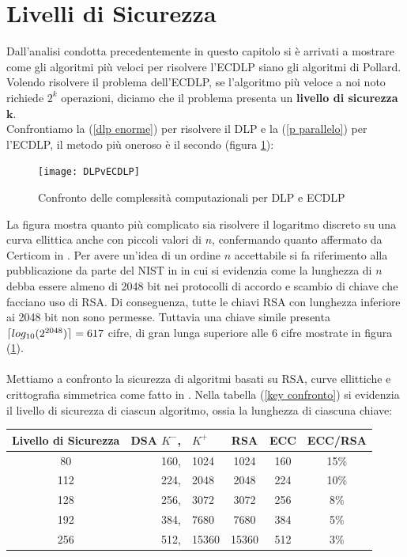 \documentclass[a4paper,12pt]{tesiinfo}
\DeclarePairedDelimiter\ceil{\lceil}{\rceil}
\begin{document}
\section{Livelli di Sicurezza}
Dall'analisi condotta precedentemente in questo capitolo si \`e arrivati a mostrare come gli algoritmi pi\`u veloci per risolvere l'ECDLP siano gli algoritmi di Pollard. Volendo risolvere il problema dell'ECDLP, se l'algoritmo pi\`u veloce a noi noto richiede $2^k$ operazioni, diciamo che il problema presenta un \textbf{livello di sicurezza }$\mathbold{k}$. 
\\
Confrontiamo la (\ref{dlp enorme}) per risolvere il DLP e la (\ref{p parallelo}) per l'ECDLP, il metodo pi\`u oneroso \`e il secondo (figura \ref{DLPvECDLP}):
\begin{figure}[H]
 \texttt{[image: DLPvECDLP]}
 \caption{Confronto delle complessit\`a computazionali per DLP e ECDLP}
 \label{DLPvECDLP}
\end{figure}
La figura mostra quanto pi\`u complicato sia risolvere il logaritmo discreto su una curva ellittica anche con piccoli valori di $n$, confermando quanto affermato da Certicom in \cite{Certicom pollard p}. 
Per avere un'idea di un ordine $n$ accettabile si fa riferimento alla pubblicazione da parte del NIST in \cite{NIST key lenght} in cui si evidenzia come la lunghezza di $n$ debba essere almeno di 2048 bit nei protocolli di accordo e scambio di chiave che facciano uso di RSA. Di conseguenza, tutte le chiavi RSA con lunghezza inferiore ai 2048 bit non sono permesse. Tuttavia una chiave simile presenta $\ceil{log_{10}(2^{2048})} = 617$ cifre, di gran lunga superiore alle 6 cifre mostrate in figura (\ref{DLPvECDLP}).
\\
\\
Mettiamo a confronto la sicurezza di algoritmi basati su RSA, curve ellittiche e crittografia simmetrica come fatto in \cite{nist key conf}. Nella tabella (\ref{key confronto}) si evidenzia il livello di sicurezza di ciascun algoritmo, ossia la lunghezza di ciascuna chiave:
\begin{center}
\begin{tabular}{c| r l| c| c| c}
    Livello di Sicurezza & DSA $K^-$, & $K^+$ & RSA & ECC & ECC/RSA\\
   \hline
    80 & 160, & 1024 & 1024 & 160 & 15\%\\
    112 & 224, & 2048 & 2048 & 224 & 10\%\\
    128 & 256, & 3072 & 3072 & 256 & 8\%\\
    192 & 384, & 7680 & 7680 & 384 & 5\%\\
    256 & 512, & 15360 & 15360 & 512 & 3\%
    \label{key confronto}
\end{tabular}
\end{center}
\end{document}
